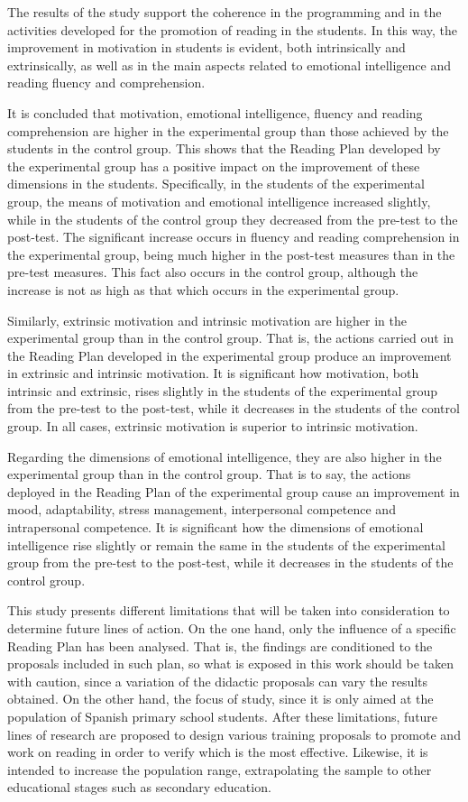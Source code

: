 \documentclass[english]{textolivre}
\begin{document}
The results of the study support the coherence in the programming and in the activities developed for the promotion of reading in the students. In this way, the improvement in motivation in students is evident, both intrinsically and extrinsically, as well as in the main aspects related to emotional intelligence and reading fluency and comprehension.

It is concluded that motivation, emotional intelligence, fluency and reading comprehension are higher in the experimental group than those achieved by the students in the control group. This shows that the Reading Plan developed by the experimental group has a positive impact on the improvement of these dimensions in the students. Specifically, in the students of the experimental group, the means of motivation and emotional intelligence increased slightly, while in the students of the control group they decreased from the pre-test to the post-test. The significant increase occurs in fluency and reading comprehension in the experimental group, being much higher in the post-test measures than in the pre-test measures. This fact also occurs in the control group, although the increase is not as high as that which occurs in the experimental group.

Similarly, extrinsic motivation and intrinsic motivation are higher in the experimental group than in the control group. That is, the actions carried out in the Reading Plan developed in the experimental group produce an improvement in extrinsic and intrinsic motivation. It is significant how motivation, both intrinsic and extrinsic, rises slightly in the students of the experimental group from the pre-test to the post-test, while it decreases in the students of the control group. In all cases, extrinsic motivation is superior to intrinsic motivation.

Regarding the dimensions of emotional intelligence, they are also higher in the experimental group than in the control group. That is to say, the actions deployed in the Reading Plan of the experimental group cause an improvement in mood, adaptability, stress management, interpersonal competence and intrapersonal competence. It is significant how the dimensions of emotional intelligence rise slightly or remain the same in the students of the experimental group from the pre-test to the post-test, while it decreases in the students of the control group.

This study presents different limitations that will be taken into consideration to determine future lines of action. On the one hand, only the influence of a specific Reading Plan has been analysed. That is, the findings are conditioned to the proposals included in such plan, so what is exposed in this work should be taken with caution, since a variation of the didactic proposals can vary the results obtained. On the other hand, the focus of study, since it is only aimed at the population of Spanish primary school students. After these limitations, future lines of research are proposed to design various training proposals to promote and work on reading in order to verify which is the most effective. Likewise, it is intended to increase the population range, extrapolating the sample to other educational stages such as secondary education.
\end{document}
